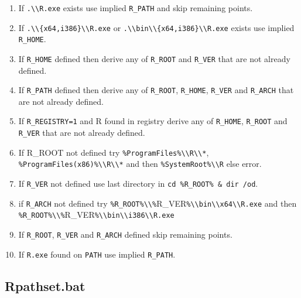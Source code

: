 \begin{enumerate}
\def\labelenumi{\arabic{enumi}.}
\item
  If \texttt{.\textbackslash{}\textbackslash{}R.exe} exists use implied
  \texttt{R\_PATH} and skip remaining points.
\item
  If
  \texttt{.\textbackslash{}\textbackslash{}\{x64,i386\}\textbackslash{}\textbackslash{}R.exe}
  or
  \texttt{.\textbackslash{}\textbackslash{}bin\textbackslash{}\textbackslash{}\{x64,i386\}\textbackslash{}\textbackslash{}R.exe}
  exists use implied \texttt{R\_HOME}.
\item
  If \texttt{R\_HOME} defined then derive any of \texttt{R\_ROOT} and
  \texttt{R\_VER} that are not already defined.
\item
  If \texttt{R\_PATH} defined then derive any of \texttt{R\_ROOT},
  \texttt{R\_HOME}, \texttt{R\_VER} and \texttt{R\_ARCH} that are not
  already defined.
\item
  If \texttt{R\_REGISTRY=1} and R found in registry derive any of
  \texttt{R\_HOME}, \texttt{R\_ROOT} and \texttt{R\_VER} that are not
  already defined.
\item
  If R\_ROOT not defined try
  \texttt{\%ProgramFiles\%\textbackslash{}\textbackslash{}R\textbackslash{}\textbackslash{}*},
  \texttt{\%ProgramFiles(x86)\%\textbackslash{}\textbackslash{}R\textbackslash{}\textbackslash{}*}
  and then \texttt{\%SystemRoot\%\textbackslash{}\textbackslash{}R} else
  error.
\item
  If \texttt{R\_VER} not defined use last directory in
  \texttt{cd \%R\_ROOT\% \& dir /od}.
\item
  if \texttt{R\_ARCH} not defined try
  \texttt{\%R\_ROOT\%\textbackslash{}\textbackslash{}\%}R\_VER\texttt{\%\textbackslash{}\textbackslash{}bin\textbackslash{}\textbackslash{}x64\textbackslash{}\textbackslash{}R.exe}
  and then
  \texttt{\%R\_ROOT\%\textbackslash{}\textbackslash{}\%}R\_VER\texttt{\%\textbackslash{}\textbackslash{}bin\textbackslash{}\textbackslash{}i386\textbackslash{}\textbackslash{}R.exe}
\item
  If \texttt{R\_ROOT}, \texttt{R\_VER} and \texttt{R\_ARCH} defined skip
  remaining points.
\item
  If \texttt{R.exe} found on \texttt{PATH} use implied \texttt{R\_PATH}.
\end{enumerate}

\subsection{Rpathset.bat}

